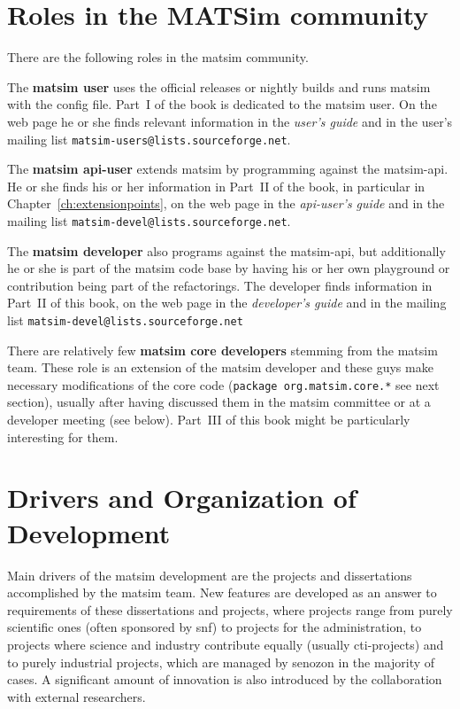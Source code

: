 \section{Roles in the MATSim community}
\label{sec:roles}
There are the following roles in the \gls{matsim} community.
%
\begin{compactitem}
\item The \textbf{\gls{matsim} user} uses the official releases or nightly builds and runs \gls{matsim} with the config file. Part~I of the book is dedicated to the \gls{matsim} user. On the web page he or she finds relevant information in the \emph{user's guide} and in the user's mailing list \lstinline|matsim-users@lists.sourceforge.net|.
\item The \textbf{\gls{matsim} \gls{api}-user} extends \gls{matsim} by programming against the \gls{matsim}-\gls{api}. He or she finds his or her information in Part~II of the book, in particular in Chapter~\ref{ch:extensionpoints}, on the web page in the \emph{\gls{api}-user's guide} and in the mailing list \lstinline|matsim-devel@lists.sourceforge.net|.
\item The \textbf{\gls{matsim} developer} also programs against the \gls{matsim}-\gls{api}, but additionally he or she is part of the \gls{matsim} code base by having his or her own playground or contribution being part of the refactorings. 
The developer finds information in Part~II of this book, on the web page in the \emph{developer's guide} and in the mailing list \lstinline|matsim-devel@lists.sourceforge.net| 
\item There are relatively few \textbf{\gls{matsim} core developers} stemming from the \gls{matsim} team. These role is an extension of the \gls{matsim} developer and these guys make necessary modifications of the core code (\lstinline|package org.matsim.core.*| see next section), usually after having discussed them in the \gls{matsim} committee or at a developer meeting (see below). Part~III of this book might be particularly interesting for them.
\end{compactitem}
%
\section{Drivers and Organization of Development}
Main drivers of the \gls{matsim} development are the projects and dissertations accomplished by the \gls{matsim} team. New features are developed as an answer to requirements of these dissertations and projects, where projects range from purely scientific ones (often sponsored by \gls{snf}) to projects for the administration, to projects where science and industry contribute equally (usually \gls{cti}-projects) and to purely industrial projects, which are managed by \gls{senozon} in the majority of cases. A significant amount of innovation is also introduced by the collaboration with external researchers.

